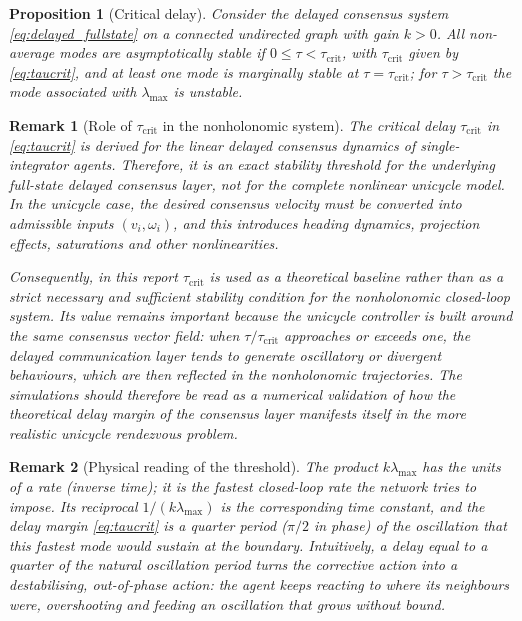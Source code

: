 \documentclass[11pt,a4paper]{article}
\newtheorem{proposition}{Proposition}
\newtheorem{remark}{Remark}
\newcommand{\taucrit}{\tau_{\mathrm{crit}}}
\newcommand{\lammax}{\lambda_{\max}}
\begin{document}
\begin{proposition}[Critical delay]
Consider the delayed consensus system \eqref{eq:delayed_fullstate} on a connected undirected
graph with gain $k>0$. All non-average modes are asymptotically stable if $0\le\tau<\taucrit$,
with $\taucrit$ given by \eqref{eq:taucrit}, and at least one mode is marginally stable at
$\tau=\taucrit$; for $\tau>\taucrit$ the mode associated with $\lammax$ is unstable.
\end{proposition}

\begin{remark}[Role of $\taucrit$ in the nonholonomic system]
The critical delay $\taucrit$ in \eqref{eq:taucrit} is derived for the linear delayed consensus
dynamics of single-integrator agents. Therefore, it is an exact stability threshold for the
underlying full-state delayed consensus layer, not for the complete nonlinear unicycle model.
In the unicycle case, the desired consensus velocity must be converted into admissible inputs
$(v_i,\omega_i)$, and this introduces heading dynamics, projection effects, saturations and
other nonlinearities.

Consequently, in this report $\taucrit$ is used as a theoretical baseline rather than as a
strict necessary and sufficient stability condition for the nonholonomic closed-loop system.
Its value remains important because the unicycle controller is built around the same consensus
vector field: when $\tau/\taucrit$ approaches or exceeds one, the delayed communication layer
tends to generate oscillatory or divergent behaviours, which are then reflected in the
nonholonomic trajectories. The simulations should therefore be read as a numerical validation
of how the theoretical delay margin of the consensus layer manifests itself in the more
realistic unicycle rendezvous problem.
\end{remark}

\begin{remark}[Physical reading of the threshold]
The product $k\lammax$ has the units of a rate (inverse time); it is the fastest closed-loop
rate the network tries to impose. Its reciprocal $1/(k\lammax)$ is the corresponding time
constant, and the delay margin \eqref{eq:taucrit} is a quarter period
($\pi/2$ in phase) of the oscillation that this fastest mode would sustain at the boundary.
Intuitively, a delay equal to a quarter of the natural oscillation period turns the corrective
action into a destabilising, out-of-phase action: the agent keeps reacting to where its
neighbours \emph{were}, overshooting and feeding an oscillation that grows without bound.
\end{remark}
\end{document}
